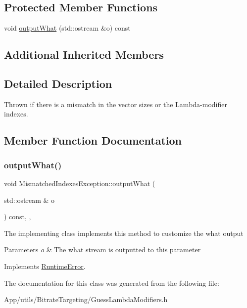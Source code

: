 \subsection*{Protected Member Functions}
\begin{DoxyCompactItemize}
\item 
void \hyperlink{class_mismatched_indexes_exception_a139455007e7a5bb092650d4f2929068a}{output\+What} (std\+::ostream \&o) const
\end{DoxyCompactItemize}
\subsection*{Additional Inherited Members}


\subsection{Detailed Description}
Thrown if there is a mismatch in the vector sizes or the Lambda-\/modifier indexes. 

\subsection{Member Function Documentation}
\mbox{\label{class_mismatched_indexes_exception_a139455007e7a5bb092650d4f2929068a}} 
\subsubsection{\texorpdfstring{output\+What()}{outputWhat()}}
{\footnotesize\ttfamily void Mismatched\+Indexes\+Exception\+::output\+What (\begin{DoxyParamCaption}\item[{std\+::ostream \&}]{o }\end{DoxyParamCaption}) const\hspace{0.3cm}{\ttfamily [inline]}, {\ttfamily [protected]}, {\ttfamily [virtual]}}

The implementing class implements this method to customize the what output 
\begin{DoxyParams}{Parameters}
{\em o} & The what stream is outputted to this parameter \\
\hline
\end{DoxyParams}


Implements \hyperlink{class_runtime_error_a5020b04a2a7fac8b1dbfbfe4a30055b0}{Runtime\+Error}.



The documentation for this class was generated from the following file\+:\begin{DoxyCompactItemize}
\item 
App/utils/\+Bitrate\+Targeting/Guess\+Lambda\+Modifiers.\+h\end{DoxyCompactItemize}
